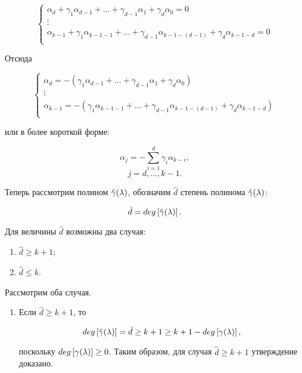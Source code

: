 \begin{statement}
\begin{enumerate}
				$$
					\left \{
					\begin{array}{c}
						\alpha_d + \gamma_1 \alpha_{d-1} + \dots + \gamma_{d-1} \alpha_1 + \gamma_d \alpha_0 = 0 \\
						\vdots \\
						\alpha_{k-1} + \gamma_1 \alpha_{k-1-1} + \dots + \gamma_{d-1} \alpha_{k-1-(d-1)} + \gamma_d \alpha_{k-1-d} = 0 \\
					\end{array}
					\right .
				$$

			Отсюда

				$$
					\left \{
					\begin{array}{c}
						\alpha_d = - \left ( \gamma_1 \alpha_{d-1} + \dots + \gamma_{d-1} \alpha_1 + \gamma_d \alpha_0 \right ) \\
						\vdots \\
						\alpha_{k-1} = - \left ( \gamma_1 \alpha_{k-1-1} + \dots + \gamma_{d-1} \alpha_{k-1-(d-1)} + \gamma_d \alpha_{k-1-d} \right ) \\
					\end{array}
					\right .
				$$

			или в более короткой форме:

				\begin{equation} \label{equation:MDAP:alpha_through_gamma}
					\alpha_j = - \sum_{i=1}^d \gamma_i \alpha_{k-i},
				\end{equation}
				$$ j = d, \dots, k-1. $$

			Теперь рассмотрим полином $\hat\gamma (\lambda)$, обозначим $\hat d$ степень полинома $\hat\gamma (\lambda)$:

				$$ \hat d = deg \left [ \hat\gamma (\lambda) \right ]. $$

			Для величины $\hat d$ возможны два случая:

			\begin{enumerate}
				\item $\hat d \ge k+1$;
				\item $\hat d \le k$.
			\end{enumerate}

			Рассмотрим оба случая.

			\begin{enumerate}
				\item
					Если $\hat d \ge k+1$, то

						$$ deg \left [ \hat\gamma (\lambda) \right ] = \hat d \ge k + 1 \ge k + 1 - deg \left [ \gamma (\lambda) \right ], $$

					поскольку $deg \left [ \gamma (\lambda) \right ] \ge 0$. Таким образом, для случая $\hat d \ge k+1$ утверждение доказано.


\end{enumerate}
\end{enumerate}
\end{statement}
